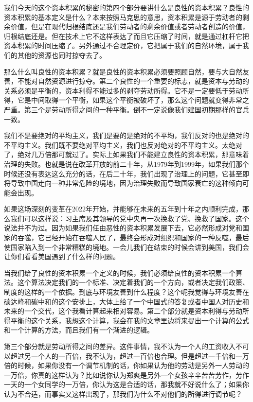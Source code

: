 \documentclass[UTF8, 12pt, a4paper]{ctexrep}
\begin{document}
我们今天的这个资本积累的秘密的第四个部分要讲什么是良性的资本积累？良性的资本积累的基本定义是什么？本来按照马克思的意思，资本积累是源于劳动者的剩余价值，但是在现代归根结底还是我们劳动者的剩余价值或者劳动者创造的价值，归根结底还是。但在技术上它不这样表达了而且它压缩了时间，就是通过杠杆它把资本积累的时间压缩了。另外通过不合理定价，它把属于我们的自然环境，属于我们的其他的资源也同时掠夺去了。

那么什么叫良性的资本积累？就是良性的资本积累必须要照顾自然，要与大自然友善，不能对自然资源进行掠夺。第二个良性的一个重要的标志，就是资本与劳动的关系必须是平衡的，资本利得不能过多的剥夺劳动所得。它不是一定要低于劳动所得，它是中间取得一个平衡，如果这个平衡被破坏了，那么这个问题就变得非常之严重。第三个是劳动所得之间的一种平衡。倒不一定说像我们建国初期那样的官兵一致。

我们不是要绝对的平均主义，我们是要的是绝对的不平均，我们反对的也是绝对的不平均主义。我们既不要绝对平均主义，我们也反对绝对的不平均主义。太绝对了，绝对几万倍那可就过了。实际上如果我们不能建立良性的资本积累，那意味着治理的失败。也就是说在改革开放的前二十年，从1979年到1999年，如果我们那个时候还没有表达这么充分的话，在后二十年，我们出现了治理上的问题，它甚至即将导致中国走向一种非常危险的境地，因为治理失败而导致国家衰亡的这种倾向可能会出现。

如果这场深刻的变革在2022年开始，并能够在未来的五年到十年之内顺利完成，那么我们可以这样说：习主席及其领导的党中央再一次挽救了党、挽救了国家。这个说法并不为过。因为如果我们任由恶性的资本积累发展下去，它必然形成对党和国家的吞噬，它已经开始在吞噬人民了，最终会形成对组织和国家的一种反噬，最后使国家陷入到一个非常糟糕的境地。一会儿我们在结束的时候会讲到美国，我们会让你们看看美国遇到了什么样的问题。

当我们给了良性的资本积累一个定义的时候，我们必须给良性的资本积累一个算法。这个算法决定我们的一个标准、决定着我们的一个方向，或者决定我们政策、制度的这样的一个依据。到底与环境友善到什么程度？这个呢我觉得与环境友善在碳达峰和碳中和的这个安排上，大体上给了一个中国式的答复或者中国人对历史和未来的一个交代，这个我看计算起来相对容易。第二个部分就是资本利得与劳动所得平衡的这个关系，我想这个计算，我会在我的文章里边将来提出一个计算的公式和一个计算的方法，而且我们有一个渐进的逻辑。

第三个部分就是劳动所得之间的差异。这件事情，我不认为一个人的工资收入不可以超过另一个人的一百倍，我不认为，超过一百倍也合理。但是超过一千倍和一万倍的时候，如果你没有一个调节机制的话，你如果认为他的劳动是另外一人劳动的一万倍，你真的这样认为？比如说你认为郑爽是另外一个女孩辛辛苦苦劳作，劳作一天的一个女同学的一万倍，你认为这是合适的话，那我就不好说什么了；如果你认为不合适，而事实又这样出现了，那我们为什么不对他们的所得进行调节呢？
\end{document}

